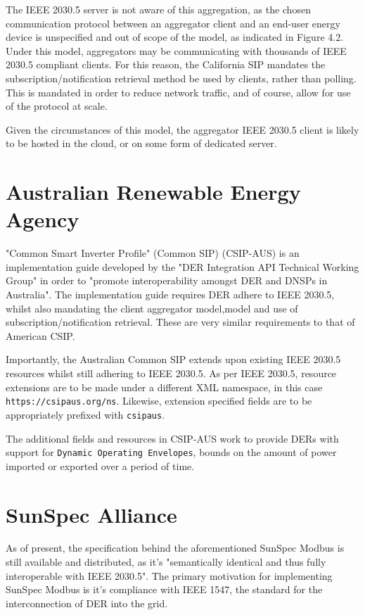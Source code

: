 The IEEE 2030.5 server is not aware of this aggregation, as the chosen communication protocol between an aggregator client and an end-user energy device is unspecified and out of scope of the model, as indicated in Figure 4.2.
Under this model, aggregators may be communicating with thousands of IEEE 2030.5 compliant clients. For this reason, the California SIP mandates the subscription/notification retrieval method be used by clients, rather than polling.
This is mandated in order to reduce network traffic, and of course, allow for use of the protocol at scale.

Given the circumstances of this model, the aggregator IEEE 2030.5 client is likely to be hosted in the cloud, or on some form of dedicated server.


\section{Australian Renewable Energy Agency}
"Common Smart Inverter Profile" (Common SIP) (CSIP-AUS) is an implementation guide developed by the "DER Integration API Technical Working Group" in order to "promote interoperability amongst DER and DNSPs in Australia".
The implementation guide requires DER adhere to IEEE 2030.5, whilst also mandating the client aggregator model,model and use of subscription/notification retrieval. These are very similar requirements to that of American CSIP. \cite[]{CSIPAus}

Importantly, the Australian Common SIP extends upon existing IEEE 2030.5 resources whilst still adhering to IEEE 2030.5.
As per IEEE 2030.5, resource extensions are to be made under a different XML namespace, in this case \texttt{https://csipaus.org/ns}. Likewise, extension specified fields are to be appropriately prefixed with \texttt{csipaus}. 

The additional fields and resources in CSIP-AUS work to provide DERs with support for \texttt{Dynamic Operating Envelopes}, bounds on the amount of power imported or exported over a period of time. \cite[]{CSIPAus}

\section{SunSpec Alliance}

As of present, the specification behind the aforementioned SunSpec Modbus is still available and distributed, as it's "semantically identical and thus fully interoperable with IEEE 2030.5". 
The primary motivation for implementing SunSpec Modbus is it's compliance with IEEE 1547, the standard for the interconnection of DER into the grid. \cite[]{SunSpecModbus}

